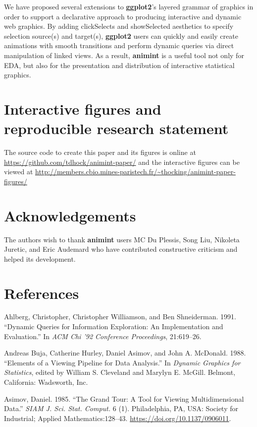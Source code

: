 \documentclass[12pt,]{article}
\theoremstyle{definition}
\theoremstyle{definition}
\theoremstyle{definition}
\theoremstyle{remark}
\begin{document}
We have proposed several extensions to \textbf{ggplot2}'s layered
grammar of graphics in order to support a declarative approach to
producing interactive and dynamic web graphics. By adding clickSelects
and showSelected aesthetics to specify selection source(s) and
target(s), \textbf{ggplot2} users can quickly and easily create
animations with smooth transitions and perform dynamic queries via
direct manipulation of linked views. As a result, \textbf{animint} is a
useful tool not only for EDA, but also for the presentation and
distribution of interactive statistical graphics.

\section*{Interactive figures and reproducible research statement}

The source code to create this paper and its figures is online at
\url{https://github.com/tdhock/animint-paper/} and the interactive
figures can be viewed at
\url{http://members.cbio.mines-paristech.fr/~thocking/animint-paper-figures/}

\section*{Acknowledgements}

The authors wish to thank \textbf{animint} users MC Du Plessis, Song
Liu, Nikoleta Juretic, and Eric Audemard who have contributed
constructive criticism and helped its development.

\section*{References}

\hypertarget{refs}{}
\leavevmode\hypertarget{ref-Ahlberg:1991}{}%
Ahlberg, Christopher, Christopher Williamson, and Ben Shneiderman. 1991.
``Dynamic Queries for Information Exploration: An Implementation and
Evaluation.'' In \emph{ACM Chi '92 Conference Proceedings}, 21:619--26.

\leavevmode\hypertarget{ref-viewing-pipeline}{}%
Andreas Buja, Catherine Hurley, Daniel Asimov, and John A. McDonald.
1988. ``Elements of a Viewing Pipeline for Data Analysis.'' In
\emph{Dynamic Graphics for Statistics}, edited by William S. Cleveland
and Marylyn E. McGill. Belmont, California: Wadsworth, Inc.

\leavevmode\hypertarget{ref-grand-tour}{}%
Asimov, Daniel. 1985. ``The Grand Tour: A Tool for Viewing
Multidimensional Data.'' \emph{SIAM J. Sci. Stat. Comput.} 6 (1).
Philadelphia, PA, USA: Society for Industrial; Applied
Mathematics:128--43. \url{https://doi.org/10.1137/0906011}.
\end{document}
